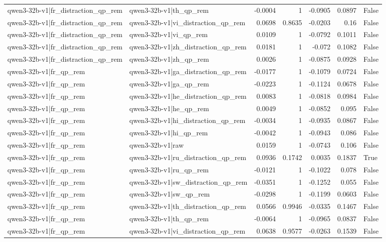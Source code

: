 \begin{table}
\begin{tabular}{l l r r r r l}
qwen3-32b-v1|fr_distraction_qp_rem & qwen3-32b-v1|th_qp_rem & -0.0004 & 1 & -0.0905 & 0.0897 & False \\
qwen3-32b-v1|fr_distraction_qp_rem & qwen3-32b-v1|vi_distraction_qp_rem & 0.0698 & 0.8635 & -0.0203 & 0.16 & False \\
qwen3-32b-v1|fr_distraction_qp_rem & qwen3-32b-v1|vi_qp_rem & 0.0109 & 1 & -0.0792 & 0.1011 & False \\
qwen3-32b-v1|fr_distraction_qp_rem & qwen3-32b-v1|zh_distraction_qp_rem & 0.0181 & 1 & -0.072 & 0.1082 & False \\
qwen3-32b-v1|fr_distraction_qp_rem & qwen3-32b-v1|zh_qp_rem & 0.0026 & 1 & -0.0875 & 0.0928 & False \\
qwen3-32b-v1|fr_qp_rem & qwen3-32b-v1|ga_distraction_qp_rem & -0.0177 & 1 & -0.1079 & 0.0724 & False \\
qwen3-32b-v1|fr_qp_rem & qwen3-32b-v1|ga_qp_rem & -0.0223 & 1 & -0.1124 & 0.0678 & False \\
qwen3-32b-v1|fr_qp_rem & qwen3-32b-v1|he_distraction_qp_rem & 0.0083 & 1 & -0.0818 & 0.0984 & False \\
qwen3-32b-v1|fr_qp_rem & qwen3-32b-v1|he_qp_rem & 0.0049 & 1 & -0.0852 & 0.095 & False \\
qwen3-32b-v1|fr_qp_rem & qwen3-32b-v1|hi_distraction_qp_rem & -0.0034 & 1 & -0.0935 & 0.0867 & False \\
qwen3-32b-v1|fr_qp_rem & qwen3-32b-v1|hi_qp_rem & -0.0042 & 1 & -0.0943 & 0.086 & False \\
qwen3-32b-v1|fr_qp_rem & qwen3-32b-v1|raw & 0.0159 & 1 & -0.0743 & 0.106 & False \\
qwen3-32b-v1|fr_qp_rem & qwen3-32b-v1|ru_distraction_qp_rem & 0.0936 & 0.1742 & 0.0035 & 0.1837 & True \\
qwen3-32b-v1|fr_qp_rem & qwen3-32b-v1|ru_qp_rem & -0.0121 & 1 & -0.1022 & 0.078 & False \\
qwen3-32b-v1|fr_qp_rem & qwen3-32b-v1|sw_distraction_qp_rem & -0.0351 & 1 & -0.1252 & 0.055 & False \\
qwen3-32b-v1|fr_qp_rem & qwen3-32b-v1|sw_qp_rem & -0.0298 & 1 & -0.1199 & 0.0603 & False \\
qwen3-32b-v1|fr_qp_rem & qwen3-32b-v1|th_distraction_qp_rem & 0.0566 & 0.9946 & -0.0335 & 0.1467 & False \\
qwen3-32b-v1|fr_qp_rem & qwen3-32b-v1|th_qp_rem & -0.0064 & 1 & -0.0965 & 0.0837 & False \\
qwen3-32b-v1|fr_qp_rem & qwen3-32b-v1|vi_distraction_qp_rem & 0.0638 & 0.9577 & -0.0263 & 0.1539 & False \\

\end{tabular}
\end{table}
